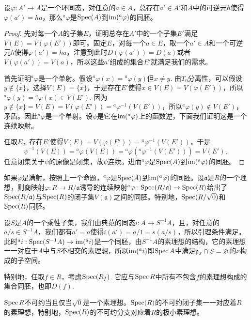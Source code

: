 \begin{lem}
设$\varphi:A'\to A$是一个环同态，对任意的$a\in A$，总存在$a'\in A'$和$A$中的可逆元$h$使得$\varphi(a')=ha$，那么$^a\varphi$是$\operatorname{Spec}(A)$到$\operatorname{im} (^a\varphi)$的同胚。
\end{lem}

\begin{proof} 先对每一个$A$的子集$E$，证明总存在$A'$中的一个子集$E'$满足$V(E)=V(\varphi(E'))$即可。固定$E$，对每一个$a\in E$，取一个$a'\in A$和一个可逆元$h$使得$\varphi(a')=ha$，注意到此时$D(\varphi(a'))=D(a)$或者$V(\varphi(a'))=V(a)$，所以这些$a'$组成的集合$E'$就满足我们的需求。

首先证明$^a\varphi$是一个单射。假设$^a\varphi(x)={}^a\varphi(y)$但$x\neq y$. 由$T_0$分离性，可以假设$y\not\in \overline{\{x\}}$，选择$V(E)=\overline{\{x\}}$，于是存在$E'$使得$x\in V(E)=V(\varphi(E'))$，所以${}^a\varphi(y)={}^a\varphi(x)\in V(E')$. 因为$y\not\in \overline{\{x\}}=V(E)=V(\varphi(E'))={}^a\varphi^{-1}(V(E'))$，所以${}^a\varphi(y)\not\in V(E')$，矛盾。因此$^a\varphi$是一个单射。设$\psi$是它在$\operatorname{im} (^a\varphi)$上的函数逆，下面我们证明这是一个连续映射。

任取$E$，存在$E'$使得$V(E)=V(\varphi(E'))={}^a\varphi^{-1}(V(E'))$，于是
\[
	\psi^{-1}(V(E))={}^a\varphi(V(E))={}^a\varphi({}^a\varphi^{-1}(V(E')))=V(E'),
\]
任意闭集关于$\psi$的原像是闭集，故$\psi$连续。进而$^a\varphi$是$\operatorname{Spec}(A)$到$\operatorname{im} (^a\varphi)$的同胚。\end{proof}

如果$\varphi$是满射，按照上一个命题，$^a\varphi$是$\operatorname{Spec}(A)$到$\operatorname{im} (^a\varphi)$的同胚。设$\mathfrak{a}$是$R$的一个理想，则商映射$\varphi:R\to R/\mathfrak{a}$诱导的连续映射$^a\varphi:\operatorname{Spec}(R/\mathfrak{a})\to \operatorname{Spec}(R)$给出了$\operatorname{Spec}(R/\mathfrak{a})$与$\operatorname{Spec}(R)$的闭子集$V(\mathfrak{a})$之间的同胚。特别地，$\operatorname{Spec}(R/\sqrt{0})$和$\operatorname{Spec}(R)$同胚。

设$S$是$A$的一个乘性子集，我们由典范的同态$i:A\to S^{-1}A$，且，对任意的$a/s\in S^{-1}A$，我们都有$a'=a$使得$i(a')=a/1=s(a/s)$，所以引理条件满足。此时${}^ai:\operatorname{Spec}(S^{-1}A)\to \operatorname{im} ({}^ai)$是一个同胚，由$S^{-1}A$的素理想的结构，它的素理想一一对应于$A$中与$S$不相交的素理想，所以$\operatorname{im} ({}^ai)$即$\operatorname{Spec} A$中满足$\mathfrak{p}_x\cap S=\varnothing$的$x$构成的子空间。

特别地，任取$f\in R$，考虑$\operatorname{Spec}(R_f)$. 它应与$\operatorname{Spec} R$中所有不包含$f$的素理想构成的集合同胚，也即$D(f)$. 

\begin{pro}
$\operatorname{Spec} R$不可约当且仅当$\sqrt{0}$是一个素理想。$\operatorname{Spec}(R)$的不可约闭子集一一对应着$R$的素理想，特别地，$\operatorname{Spec}(R)$的不可约分支对应着$R$的极小素理想。
\end{pro}

